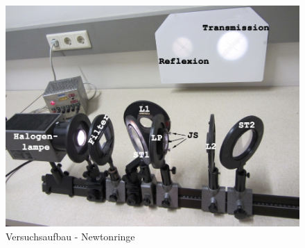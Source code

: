 \documentclass[12pt,a4paper]{article}
\begin{document}
\begin{multicols}{2}
\begin{figure}[H]
	\centering
	\includegraphics[scale=0.45]{./figure/newtonringe_aufbau.png}
	\caption{Versuchsaufbau - Newtonringe}
	\label{fig:newtonringe_aufbau}
\end{figure}


\end{multicols}
\end{document}
